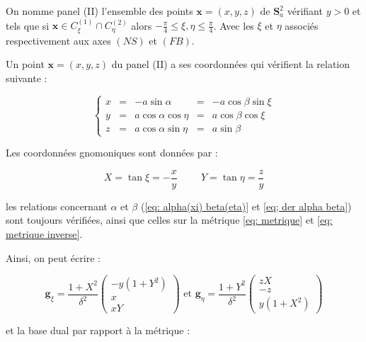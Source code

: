 \begin{definition}
On nomme panel (II) l'ensemble des points $\mathbf{x}=(x,y,z)$ de $\mathbf{S}_a^2$ vérifiant $y>0$ et tels que si $\mathbf{x} \in C_{\xi}^{(1)} \cap C_{\eta}^{(2)}$ alors $-\frac{\pi}{4}\leq \xi,\eta \leq \frac{\pi}{4}$. Avec les $\xi$ et $\eta$ associés respectivement aux axes $(NS)$ et $(FB)$.
\end{definition}

Un point $\mathbf{x}=(x,y,z)$ du panel (II) a ses coordonnées qui vérifient la relation suivante :

\begin{equation}
\left\lbrace
\begin{array}{rcccc}
x & = & - a \sin \alpha & = & - a \cos \beta \sin \xi \\
y & = & a \cos \alpha \cos \eta & = & a \cos \beta \cos \xi \\
z & = & a \cos \alpha \sin \eta & = & a \sin \beta
\end{array}
\right.
\end{equation}

Les coordonnées gnomoniques sont données par :

\begin{equation}
X = \tan \xi = - \dfrac{x}{y} \hspace{1cm} Y = \tan \eta = \dfrac{z}{y}
\end{equation}

les relations concernant $\alpha$ et $\beta$ (\eqref{eq: alpha(xi) beta(eta)} et \eqref{eq; der alpha beta}) sont toujours vérifiées, ainsi que celles sur la métrique \eqref{eq: metrique} et \eqref{eq: metrique inverse}.

Ainsi, on peut écrire : 

\begin{equation}
\mathbf{g}_{\xi} = \dfrac{1+X^2}{\delta^2} \begin{pmatrix}
-y(1+Y^2) \\ x \\ xY
\end{pmatrix} \text{ et } \mathbf{g}_{\eta} = \dfrac{1+Y^2}{\delta^2} \begin{pmatrix}
zX \\ -z \\ y(1+X^2)
\end{pmatrix}
\label{eq: base locale II}
\end{equation}

et la base dual par rapport à la métrique :

